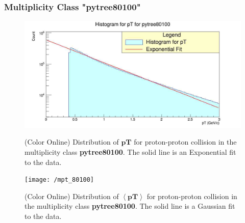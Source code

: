 \documentclass[letterpaper,aps,prc,superscriptaddress,nofootinbib,10pt,showpacs,floatfix]{revtex4-2}%
\begin{document}
\subsubsection{Multiplicity Class "pytree80100"}
\label{subsubsec:80100}
\vspace{-5mm}
\begin{figure}[!htb]
   \begin{minipage}{0.48\textwidth}
   \label{Fig:4a}
   \label{Fig:4b}
     \centering
     \renewcommand{\thefigure}{4a}
     \includegraphics[width=1.1\linewidth]{pt_80100}
     \caption{(Color Online) Distribution of $\mathbf{pT}$ for proton-proton collision in the multiplicity class \textbf{pytree80100}. The solid line is an Exponential fit to the data.}
   \end{minipage}\hfill
   \begin{minipage}{0.48\textwidth}
     \centering
     \renewcommand{\thefigure}{4b}
     \texttt{[image: /mpt\_80100]}
     \caption{(Color Online) Distribution of $\mathbf{\left<pT\right>}$ for proton-proton collision in the multiplicity class \textbf{pytree80100}. The solid line is a Gaussian fit to the data.}
   \end{minipage}
\end{figure}

\FloatBarrier
\vspace{-3mm}
\end{document}

